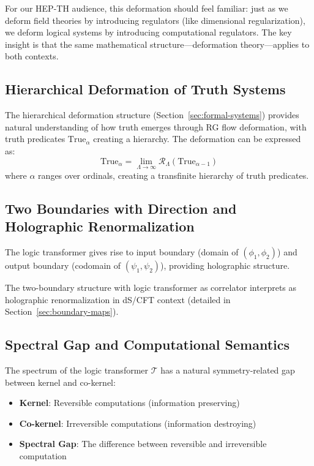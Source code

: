 For our HEP-TH audience, this deformation should feel familiar: just as we deform field theories by introducing regulators (like dimensional regularization), we deform logical systems by introducing computational regulators. The key insight is that the same mathematical structure—deformation theory—applies to both contexts.

\subsection{Hierarchical Deformation of Truth Systems}

The hierarchical deformation structure (Section~\ref{sec:formal-systems}) provides natural understanding of how truth emerges through RG flow deformation, with truth predicates $\text{True}_\alpha$ creating a hierarchy. The deformation can be expressed as:
\[
\text{True}_\alpha = \lim_{\Lambda \to \infty} \mathcal{R}_\Lambda(\text{True}_{\alpha-1})
\]
where $\alpha$ ranges over ordinals, creating a transfinite hierarchy of truth predicates.

\subsection{Two Boundaries with Direction and Holographic Renormalization}

\begin{definition}
\label{def:directed-boundaries-truth}
The logic transformer gives rise to input boundary (domain of $(\phi_1, \phi_2)$) and output boundary (codomain of $(\psi_1, \psi_2)$), providing holographic structure.
\end{definition}

\begin{remark}
\label{rem:holographic-renorm-truth}
The two-boundary structure with logic transformer as correlator interprets as holographic renormalization in dS/CFT context (detailed in Section~\ref{sec:boundary-maps}).
\end{remark}

\subsection{Spectral Gap and Computational Semantics}

\begin{definition}
\label{def:spectral-gap-truth}
The spectrum of the logic transformer $\mathcal{T}$ has a natural symmetry-related gap between kernel and co-kernel:
\begin{itemize}
\item \textbf{Kernel}: Reversible computations (information preserving)
\item \textbf{Co-kernel}: Irreversible computations (information destroying)
\item \textbf{Spectral Gap}: The difference between reversible and irreversible computation
\end{itemize}
\end{definition}

